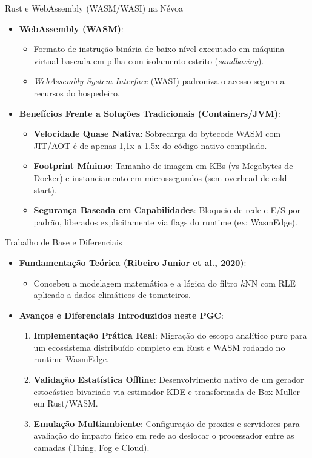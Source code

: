\documentclass[aspectratio=169]{beamer}
\begin{document}
\begin{frame}{Rust e WebAssembly (WASM/WASI) na Névoa}
  \begin{itemize}
    \item \textbf{WebAssembly (WASM)}:
      \begin{itemize}
        \item Formato de instrução binária de baixo nível executado em máquina virtual baseada em pilha com isolamento estrito (\textit{sandboxing}).
        \item \textit{WebAssembly System Interface} (WASI) padroniza o acesso seguro a recursos do hospedeiro.
      \end{itemize}
    \vspace{0.3cm}
    \item \textbf{Benefícios Frente a Soluções Tradicionais (Containers/JVM)}:
      \begin{itemize}
        \item \textbf{Velocidade Quase Nativa}: Sobrecarga do bytecode WASM com JIT/AOT é de apenas 1,1x a 1.5x do código nativo compilado.
        \item \textbf{Footprint Mínimo}: Tamanho de imagem em KBs (vs Megabytes de Docker) e instanciamento em microssegundos (sem overhead de cold start).
        \item \textbf{Segurança Baseada em Capabilidades}: Bloqueio de rede e E/S por padrão, liberados explicitamente via flags do runtime (ex: WasmEdge).
      \end{itemize}
  \end{itemize}
\end{frame}

\begin{frame}{Trabalho de Base e Diferenciais}
  \begin{itemize}
    \item \textbf{Fundamentação Teórica (Ribeiro Junior et al., 2020)}:
      \begin{itemize}
        \item Concebeu a modelagem matemática e a lógica do filtro $k$NN com RLE aplicado a dados climáticos de tomateiros.
      \end{itemize}
    \vspace{0.3cm}
    \item \textbf{Avanços e Diferenciais Introduzidos neste PGC}:
      \begin{enumerate}
        \item \textbf{Implementação Prática Real}: Migração do escopo analítico puro para um ecossistema distribuído completo em Rust e WASM rodando no runtime WasmEdge.
        \item \textbf{Validação Estatística Offline}: Desenvolvimento nativo de um gerador estocástico bivariado via estimador KDE e transformada de Box-Muller em Rust/WASM.
        \item \textbf{Emulação Multiambiente}: Configuração de proxies e servidores para avaliação do impacto físico em rede ao deslocar o processador entre as camadas (Thing, Fog e Cloud).
      \end{enumerate}
  \end{itemize}
\end{frame}
\end{document}
